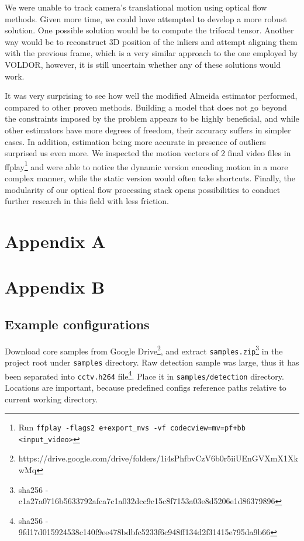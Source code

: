 \documentclass[11pt,english]{report}
\begin{document}
We were unable to track camera's translational motion using optical flow methods. Given more time, we could have attempted to develop a more robust solution. One possible solution would be to compute the trifocal tensor\cite{hartley_zisserman_2004}. Another way would be to reconstruct 3D position of the inliers and attempt aligning them with the previous frame, which is a very similar approach to the one employed by VOLDOR, however, it is still uncertain whether any of these solutions would work.

It was very surprising to see how well the modified Almeida estimator performed, compared to other proven methods. Building a model that does not go beyond the constraints imposed by the problem appears to be highly beneficial, and while other estimators have more degrees of freedom, their accuracy suffers in simpler cases. In addition, estimation being more accurate in presence of outliers surprised us even more. We inspected the motion vectors of 2 final video files in ffplay\footnote{Run \texttt{ffplay -flags2 e+export\_mvs -vf codecview=mv=pf+bb <input\_video>}} and were able to notice the dynamic version encoding motion in a more complex manner, while the static version would often take shortcuts. Finally, the modularity of our optical flow processing stack opens possibilities to conduct further research in this field with less friction.

\printbibliography

\newpage

\chapter*{Appendix A}



\newpage

\chapter*{Appendix B}

\section*{Example configurations}

Download core samples from Google Drive\footnote{https://drive.google.com/drive/folders/1i4sPhfbvCzV6b0r5iiUEnGVXmX1XkwMq}, and extract \texttt{samples.zip}\footnote{sha256 - c1a27a0716b5633792afca7c1a032dcc9c15c8f7153a03e8d5206e1d86379896} in the project root under \texttt{samples} directory. Raw detection sample was large, thus it has been separated into \texttt{cctv.h264} file\footnote{sha256 - 9fd17d015924538c140f9ee478bdbfc5233f6c948ff134d2f31415e795da9b66}. Place it in \texttt{samples/detection} directory. Locations are important, because predefined configs reference paths relative to current working directory.
\end{document}
